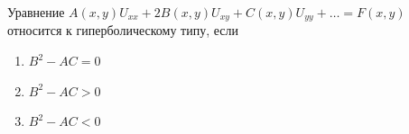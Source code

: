 Уравнение \(A\left(x,y\right)U_{xx}+2B\left(x,y\right)U_{xy}+C\left(x,y\right)U_{yy}+\dots =F\left(x,y\right)\) относится к гиперболическому типу, если

\begin{enumerate}[label=\arabic*)]
    \item \(B^2-AC=0\)
    \item \(B^2-AC>0\)
    \item \(B^2-AC<0\)
\end{enumerate}

